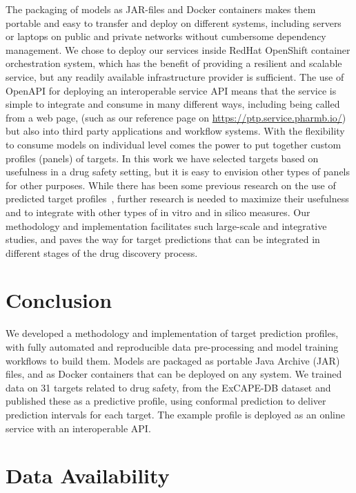 \documentclass[utf8]{frontiersSCNS} %
\begin{document}
The packaging of models as JAR-files and Docker containers makes them portable and easy to
transfer and deploy on different systems, including servers or laptops on
public and private networks without cumbersome dependency management. We chose
to deploy our services inside RedHat OpenShift container orchestration system,
which has the benefit of providing a resilient and scalable service, but any
readily available infrastructure provider is sufficient. The use of OpenAPI for
deploying an interoperable service API means that the service is simple to
integrate and consume in many different ways, including being called from a web
page, (such as our reference page on \url{https://ptp.service.pharmb.io/})
but also into third party applications and workflow systems. With the
flexibility to consume models on individual level comes the power to put
together custom profiles (panels) of targets. In this work we have selected
targets based on usefulness in a drug safety setting, but it is easy to
envision other types of panels for other purposes. While there has been some
previous research on the use of predicted target
profiles~\cite{Awale:2017is,Yao:2016ij}, further research is needed to maximize
their usefulness and to integrate with other types of in vitro and in silico
measures. Our methodology and implementation facilitates such large-scale and
integrative studies, and paves the way for target predictions that can be
integrated in different stages of the drug discovery process.


\section{Conclusion} \label{Conclusion}
We developed a methodology and implementation of target prediction profiles,
with fully automated and reproducible data pre-processing and model training
workflows to build them. Models are packaged as portable Java Archive (JAR)
files, and as Docker containers that can be deployed on any system. We trained
data on 31 targets related to drug safety, from the ExCAPE-DB dataset and published
these as a predictive profile, using conformal prediction to deliver prediction
intervals for each target. The example profile is deployed as an online service
with an interoperable API.



\section{Data Availability} \label{Data Availability}
\end{document}
